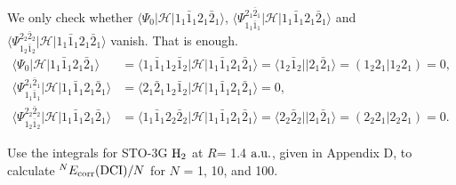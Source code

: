 \documentclass[a4paper]{book}
\newcounter{exercise}[chapter]
\newcounter{solution}[chapter]
\newcommand{\corr}{{\rm corr}}
\newcommand{\au}{{\rm a.u.}}
\begin{document}
	\begin{solution}
	
	We only check whether $\langle \Psi_0 | \mathscr{H} | 1_1 \bar{1}_1 2_1 \bar{2}_1 \rangle$, $\langle \Psi^{2_1 \bar{2}_1}_{1_1 \bar{1}_1} | \mathscr{H} | 1_1 \bar{1}_1 2_1 \bar{2}_1 \rangle$ and $\langle \Psi^{2_2 \bar{2}_2}_{1_2 \bar{1}_2} | \mathscr{H} | 1_1 \bar{1}_1 2_1 \bar{2}_1 \rangle$ vanish. That is enough.	
	\begin{align*}
		\langle \Psi_0 | \mathscr{H} | 1_1 \bar{1}_1 2_1 \bar{2}_1 \rangle &= \langle 1_1 \bar{1}_1 1_2 \bar{1}_2 | \mathscr{H} | 1_1 \bar{1}_1 2_1 \bar{2}_1 \rangle = \langle 1_2 \bar{1}_2 || 2_1 \bar{2}_1 \rangle = ( 1_2 2_1 | 1_2 2_1 ) = 0, \\
		\langle \Psi^{2_1 \bar{2}_1}_{1_1 \bar{1}_1} | \mathscr{H} | 1_1 \bar{1}_1 2_1 \bar{2}_1 \rangle &= \langle 2_1 \bar{2}_1 1_2 \bar{1}_2 | \mathscr{H} | 1_1 \bar{1}_1 2_1 \bar{2}_1 \rangle = 0 , \\
		\langle \Psi^{2_2 \bar{2}_2}_{1_2 \bar{1}_2} | \mathscr{H} | 1_1 \bar{1}_1 2_1 \bar{2}_1 \rangle &= \langle 1_1 \bar{1}_1 2_2 \bar{2}_2 | \mathscr{H} | 1_1 \bar{1}_1 2_1 \bar{2}_1 \rangle = \langle 2_2 \bar{2}_2 || 2_1 \bar{2}_1 \rangle = ( 2_2 2_1 | 2_2 2_1 ) = 0.
	\end{align*}		
	
	\end{solution}
	
	\begin{exercise}
	Use the integrals for STO-3G $\ce{H2}$ at $R$= 1.4 $\au$, given in Appendix D, to calculate ${}^{N}E_\corr({\rm DCI})/N$ for $N$ = 1, 10, and 100.
	\end{exercise}
	
\end{document}
